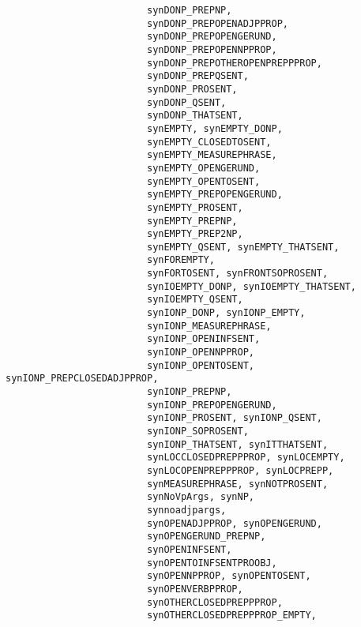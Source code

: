 \begin{verbatim}
                         synDONP_PREPNP, 
                         synDONP_PREPOPENADJPPROP,         
                         synDONP_PREPOPENGERUND,           
                         synDONP_PREPOPENNPPROP, 
                         synDONP_PREPOTHEROPENPREPPPROP,   
                         synDONP_PREPQSENT,                
                         synDONP_PROSENT,                  
                         synDONP_QSENT,                    
                         synDONP_THATSENT,                 
                         synEMPTY, synEMPTY_DONP, 
                         synEMPTY_CLOSEDTOSENT,            
                         synEMPTY_MEASUREPHRASE, 
                         synEMPTY_OPENGERUND,              
                         synEMPTY_OPENTOSENT, 
                         synEMPTY_PREPOPENGERUND,          
                         synEMPTY_PROSENT,                 
                         synEMPTY_PREPNP,                  
                         synEMPTY_PREP2NP,                 
                         synEMPTY_QSENT, synEMPTY_THATSENT, 
                         synFOREMPTY,                      
                         synFORTOSENT, synFRONTSOPROSENT,  
                         synIOEMPTY_DONP, synIOEMPTY_THATSENT,
                         synIOEMPTY_QSENT,                    
                         synIONP_DONP, synIONP_EMPTY,         
                         synIONP_MEASUREPHRASE, 
                         synIONP_OPENINFSENT,                 
                         synIONP_OPENNPPROP,                  
                         synIONP_OPENTOSENT, synIONP_PREPCLOSEDADJPPROP, 
                         synIONP_PREPNP, 
                         synIONP_PREPOPENGERUND,              
                         synIONP_PROSENT, synIONP_QSENT, 
                         synIONP_SOPROSENT, 
                         synIONP_THATSENT, synITTHATSENT, 
                         synLOCCLOSEDPREPPPROP, synLOCEMPTY,  
                         synLOCOPENPREPPPROP, synLOCPREPP,    
                         synMEASUREPHRASE, synNOTPROSENT,     
                         synNoVpArgs, synNP, 
                         synnoadjpargs,                       
                         synOPENADJPPROP, synOPENGERUND, 
                         synOPENGERUND_PREPNP,                
                         synOPENINFSENT,
                         synOPENTOINFSENTPROOBJ,         
                         synOPENNPPROP, synOPENTOSENT,   
                         synOPENVERBPPROP,
                         synOTHERCLOSEDPREPPPROP, 
                         synOTHERCLOSEDPREPPPROP_EMPTY,  

\end{verbatim}
